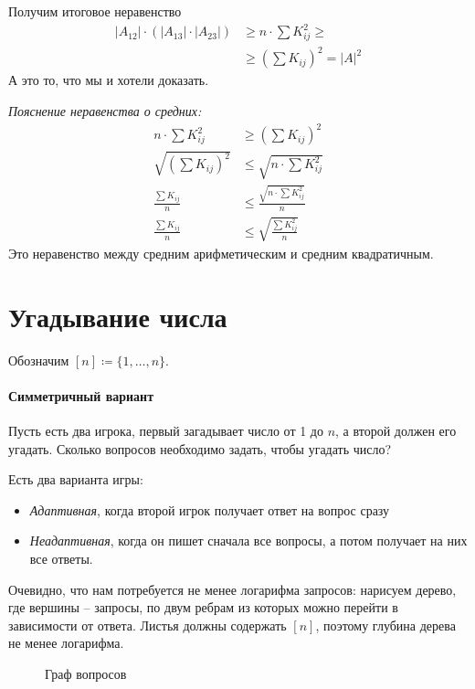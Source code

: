\begin{proof*}
    Получим итоговое неравенство
	\begin{align*}
		\lvert A_{12} \rvert  \cdot \left( \lvert A_{13} \rvert \cdot \lvert A_{23} \rvert   \right) &\ge  n \cdot \sum K_{ij}^2 \ge \tag{неравенство о средних} \\
        & \ge \left( \sum K_{ij} \right)^2 = \lvert A \rvert ^2 
	\end{align*}
	А это то, что мы и хотели доказать.
	
	\noindent
	\textit{Пояснение неравенства о средних:}
	\begin{align*}
	    n \cdot \sum K_{ij}^2 &\ge \left( \sum K_{ij} \right)^2\\
	    \sqrt{\left( \sum K_{ij} \right)^2} &\le \sqrt{n \cdot \sum K_{ij}^2}\\
	    \frac{\sum K_{ij}}{n} &\le \frac{\sqrt{n \cdot \sum K_{ij}^2}}{n}\\
	    \frac{ \sum K_{ij}}{n} &\le \sqrt{\frac{\sum K_{ij}^2}{n}}
	\end{align*}
	Это неравенство между средним арифметическим и средним квадратичным.
\end{proof*}

\newpage
\section{Угадывание числа}
Обозначим $ [n] \coloneqq \{1, \ldots , n\}$.
\paragraph{Симметричный вариант}
Пусть есть два игрока, первый загадывает число от 1 до $ n$, а второй должен его угадать. Сколько вопросов необходимо задать, чтобы угадать число?

Есть два варианта игры:
\begin{itemize}
	\item \textit{Адаптивная}, когда второй игрок получает ответ на вопрос сразу
	\item \textit{Неадаптивная}, когда он пишет сначала все вопросы, а потом получает на них все ответы.
\end{itemize}
Очевидно, что нам потребуется не менее логарифма запросов: нарисуем дерево, где вершины -- запросы, по двум ребрам из которых  можно перейти в зависимости от ответа. Листья должны содержать $ [n]$, поэтому глубина дерева не менее логарифма.
\begin{figure}[ht]
    \centering
    \label{fig:graph-img}
	\caption{Граф вопросов}
\end{figure}

